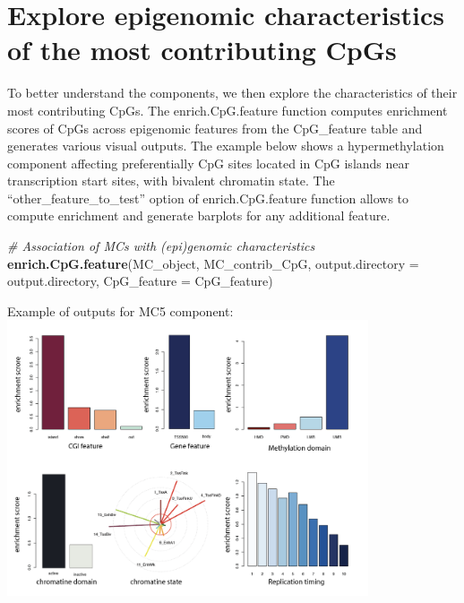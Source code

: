 \documentclass[]{article}
\newenvironment{Shaded}{\begin{snugshade}}{\end{snugshade}}
\newcommand{\KeywordTok}[1]{\textcolor[rgb]{0.13,0.29,0.53}{\textbf{#1}}}
\newcommand{\DataTypeTok}[1]{\textcolor[rgb]{0.13,0.29,0.53}{#1}}
\newcommand{\CommentTok}[1]{\textcolor[rgb]{0.56,0.35,0.01}{\textit{#1}}}
\newcommand{\NormalTok}[1]{#1}
\begin{document}
\section{Explore epigenomic characteristics of the most contributing
CpGs}\label{explore-epigenomic-characteristics-of-the-most-contributing-cpgs}

To better understand the components, we then explore the characteristics
of their most contributing CpGs. The enrich.CpG.feature function
computes enrichment scores of CpGs across epigenomic features from the
CpG\_feature table and generates various visual outputs. The example
below shows a hypermethylation component affecting preferentially CpG
sites located in CpG islands near transcription start sites, with
bivalent chromatin state. The ``other\_feature\_to\_test'' option of
enrich.CpG.feature function allows to compute enrichment and generate
barplots for any additional feature.

\begin{Shaded}
\begin{Highlighting}[]
\CommentTok{# Association of MCs with (epi)genomic characteristics}
\KeywordTok{enrich.CpG.feature}\NormalTok{(MC_object, MC_contrib_CpG, }\DataTypeTok{output.directory =}\NormalTok{ output.directory, }\DataTypeTok{CpG_feature =}\NormalTok{ CpG_feature)}
\end{Highlighting}
\end{Shaded}

Example of outputs for MC5 component:
\includegraphics[width=0.80000\textwidth,height=0.80000\textwidth]{./CpG_feature.png}
\end{document}
